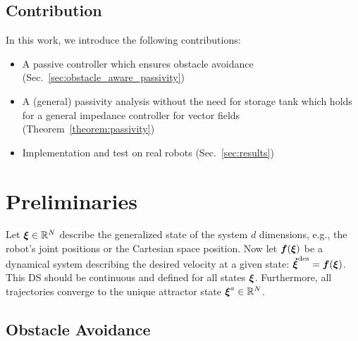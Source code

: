 \documentclass[conference]{IEEEtran}
\begin{document}
\subsection{Contribution}
In this work, we introduce the following contributions:
\begin{itemize}
\item A passive controller which ensures obstacle avoidance (Sec.~\ref{sec:obstacle_aware_passivity})
\item A (general) passivity analysis  without the need for storage tank which holds for a general impedance controller for vector fields (Theorem~\ref{theorem:passivity})
\item Implementation and test on real robots (Sec.~\ref{sec:results})
\end{itemize}

\section{Preliminaries}
Let $\boldsymbol{\xi} \in \mathbb{R}^N$ describe the generalized state of the system $d$ dimensions, e.g., the robot's joint positions or the Cartesian space position.
Now let $\boldsymbol{f}(\boldsymbol{\xi})$ be a dynamical system describing the desired velocity at a given state: $\boldsymbol{\dot\xi}^{\mathrm{des}} = \boldsymbol{f}( \boldsymbol{\xi})$.
This DS should be continuous and defined for all states $\boldsymbol{\xi}$. Furthermore, all trajectories converge to the unique attractor state $\boldsymbol{\xi} ^a \in \mathbb{R}^N$. 

\subsection{Obstacle Avoidance}

\end{document}
